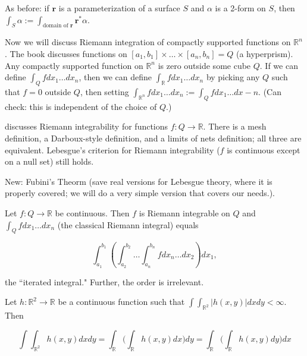 As before: if \(\boldsymbol{r}\) is a parameterization of a surface \(S\) and \(\alpha\) is a 2-form on \(S\), then \(\int_S \alpha := \int_{\text{domain of } \boldsymbol{r}} \boldsymbol{r}^* \alpha\).  

Now we will discuss Riemann integration of compactly supported functions on \(\mathbb{R}^n\). The book discusses functions on \([a_1, b_1] \times \ldots \times [a_n, b_n] = Q\) (a hyperprism). Any compactly supported function on \(\mathbb{R}^n\) is zero outside some cube \(Q\). If we can define \(\int_Q f dx_1 \ldots dx_n\), then we can define \(\int_\mathbb{R} f dx_1 \ldots dx_n\) by picking any \(Q\) such that \(f = 0\) outside \(Q\), then setting \(\int_{\mathbb{R}^n} f dx_1 \ldots dx_n := \int_Q fdx_1 \ldots dx-n\). (Can check: this is independent of the choice of \(Q\).)

\citet{pugh2015real} discusses Riemann integrability for functions \(f: Q \to \mathbb{R}\). There is a mesh definition, a Darboux-style definition, and a limits of nets definition; all three are equivalent. Lebesgue's criterion for Riemann integrability (\(f\) is continuous except on a null set) still holds. 

New: Fubini's Theorm (save real versions for Lebesgue theory, where it is properly covered; we will do a very simple version that covers our needs.). 

\begin{theorem}\label{ra.fubini.simple}  Let \(f: Q \to \mathbb{R}\) be continuous. Then \(f\) is Riemann integrable on \(Q\) and \(\int_Q f dx_1 \ldots dx_n\) (the classical Riemann integral) equals 

\[
\int_{a_1}^{b_1} \left( \int_{a_2}^{b_2} \ldots  \int_{a_n}^{b_n} f dx_n \ldots dx_2  \right) dx_1,
\]

the ``iterated integral." Further, the order is irrelevant.

\end{theorem}

\begin{theorem}\label{ra.fubini} Let \(h: \mathbb{R}^2 \to \mathbb{R}\) be a continuous function such that \(\int \int_{\mathbb{R}^2}|h(x,y)| dxdy < \infty\). Then

\[
\int \int_{\mathbb{R}^2} h(x,y)dxdy = \int_{\mathbb{R}} \bigg( \int_{\mathbb{R} } h(x,y)dx \bigg) dy = \int_{\mathbb{R}} \bigg( \int_{\mathbb{R}} h(x,y)dy \bigg) dx
\]

\end{theorem}

